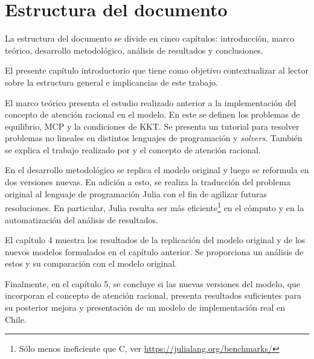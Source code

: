 \section{Estructura del documento}

La estructura del documento se divide en cinco capítulos: introducción, marco teórico, desarrollo metodológico, análisis de resultados y conclusiones.
\vspace{2.5mm}

El presente capítulo introductorio que tiene como objetivo contextualizar al lector sobre la estructura general e implicancias de este trabajo.
\vspace{2.5mm}

El marco teórico presenta el estudio realizado anterior a la implementación del concepto de atención racional en el modelo. En este se definen los problemas de equilibrio, MCP y la condiciones de KKT. Se presenta un tutorial para resolver problemas no lineales en distintos lenguajes de programación y \textit{solvers}. También se explica el trabajo realizado por  y el concepto de atención racional.
\vspace{2.5mm}

En el desarrollo metodológico se replica el modelo original y luego se reformula en dos versiones nuevas. En adición a esto, se realiza la traducción del problema original al lenguaje de programación Julia con el fin de agilizar futuras resoluciones. En particular, Julia resulta ser más eficiente\footnote{Sólo menos ineficiente que C, ver \url{https://julialang.org/benchmarks/}} en el cómputo y en la automatización del análisis de resultados.
\vspace{2.5mm}

El capítulo 4 muestra los resultados de la replicación del modelo original y de los nuevos modelos formulados en el capítulo anterior. Se proporciona un análisis de estos y su comparación con el modelo original.
\vspace{2.5mm}

Finalmente, en el capítulo 5, se concluye si las nuevas versiones del modelo, que incorporan el concepto de atención racional, presenta resultados suficientes para su posterior mejora y presentación de un modelo de implementación real en Chile.



